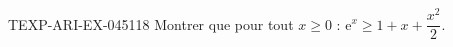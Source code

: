 \begin{exercice}{TEXP-ARI-EX-045}{1}{18}
Montrer que pour tout $x \geq 0$ : $\mathrm{e}^x \geq 1 + x + \dfrac{x^2}{2}$.

\end{exercice}

